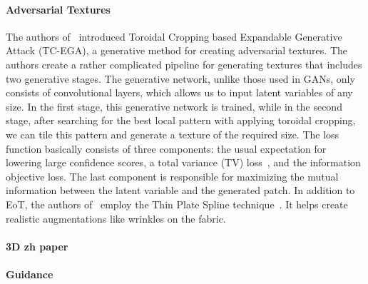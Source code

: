 \paragraph{Adversarial Textures}
The authors of~\cite{texture} introduced Toroidal Cropping based Expandable Generative Attack (TC-EGA), a generative method for creating adversarial textures.
The authors create a rather complicated pipeline for generating textures that includes two generative stages.
The generative network, unlike those used in GANs, only consists of convolutional layers, which allows us to input latent variables of any size.
In the first stage, this generative network is trained, while in the second stage, after searching for the best local pattern with applying toroidal cropping, we can tile this pattern and generate a texture of the required size.
The loss function basically consists of three components: the usual expectation for lowering large confidence scores, a total variance (TV) loss~\cite{glasses1}, and the information objective loss.
The last component is responsible for maximizing the mutual information between the latent variable and the generated patch.
In addition to EoT, the authors of~\cite{texture} employ the Thin Plate Spline technique~\cite{tps}.
It helps create realistic augmentations like wrinkles on the fabric.


\paragraph{3D zh paper}


\paragraph{Guidance}






